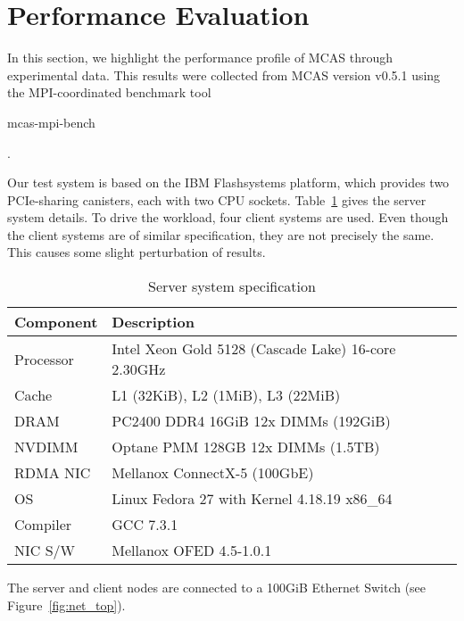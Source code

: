 \documentclass[letterpaper,twocolumn,10pt]{article}
\newcommand{\code}[1]{\begin{ttcodefont}#1\end{ttcodefont}}
\begin{document}

\section{Performance Evaluation}

In this section, we highlight the performance profile of MCAS through
experimental data. This results were collected from MCAS version v0.5.1
using the MPI-coordinated benchmark tool \code{mcas-mpi-bench}.

Our test system is based on the IBM Flashsystems platform,
which provides two PCIe-sharing canisters, each with two CPU sockets.
Table~\ref{tab:spec} gives the server system details.  To drive the
workload, four client systems are used. Even though the client systems are
of similar specification, they are not precisely the same.  This causes some
slight perturbation of results.

\begin{table}[ht]
\begin{centering}
\begin{tabularx}{1.0\linewidth}{
>{\setlength{\hsize}{.2\hsize}\raggedright\footnotesize}X
>{\setlength{\hsize}{.8\hsize}\raggedright\arraybackslash\footnotesize}X }
  \hline
  \textbf{Component} & \textbf{Description} \\
  \hline
  Processor & Intel Xeon Gold 5128 (Cascade Lake) 16-core 2.30GHz \\
  Cache & L1 (32KiB), L2 (1MiB), L3 (22MiB) \\ 
  DRAM & PC2400 DDR4 16GiB 12x DIMMs (192GiB) \\
  NVDIMM & Optane PMM 128GB 12x DIMMs (1.5TB) \\
  RDMA NIC & Mellanox ConnectX-5 (100GbE) \\
  OS & Linux Fedora 27 with Kernel 4.18.19 x86\_64 \\
  Compiler & GCC 7.3.1 \\
  NIC S/W & Mellanox OFED 4.5-1.0.1 \\   
  \hline
\end{tabularx}
\caption{Server system specification}
\label{tab:spec}
\end{centering}
\end{table}

The server and client nodes
are connected to a 100GiB Ethernet Switch (see
Figure~\ref{fig:net_top}).
\end{document}
